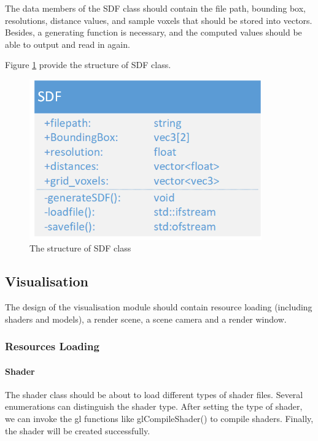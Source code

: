 \hspace*{\fill}

The data members of the SDF class should contain the file path, bounding box, resolutions, distance values, and sample voxels that should be stored into vectors. Besides, a generating function is necessary, and the computed values should be able to output and read in again.

\hspace*{\fill}

Figure \ref{ds:sdfclass} provide the structure of SDF class.

\begin{figure}[htbp]
    \centering
    \includegraphics[width=10cm]{Images/Chap3/SDFclass.png}
    \caption{The structure of SDF class}
    \label{ds:sdfclass}
\end{figure}

\subsection{Visualisation}
\label{ds:visual}

The design of the visualisation module should contain resource loading (including shaders and models), a render scene, a scene camera and a render window.

\subsubsection{Resources Loading}
\label{ds:resource}

\paragraph{Shader}

The shader class should be about to load different types of shader files. Several enumerations can distinguish the shader type. After setting the type of shader, we can invoke the gl functions like glCompileShader() to compile shaders. Finally, the shader will be created successfully. 

